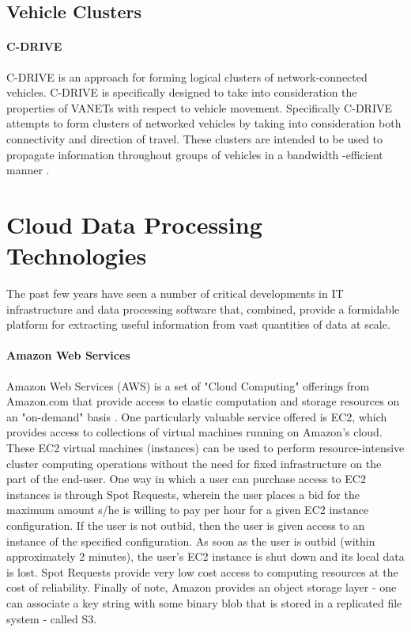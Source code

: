 \documentclass{thesis}
\begin{document}
    \subsection{Vehicle Clusters}
        \paragraph{C-DRIVE}
            C-DRIVE is an approach for forming logical clusters of network-connected vehicles.
            C-DRIVE is specifically designed to take into consideration the properties
            of VANETs with respect to vehicle movement. Specifically C-DRIVE attempts
            to form clusters of networked vehicles by taking into consideration both
            connectivity and direction of travel. These clusters are intended to be
            used to propagate information throughout groups of vehicles in a bandwidth
            -efficient manner \cite{cdrive}.
    \section{Cloud Data Processing Technologies}
        The past few years have seen a number of critical developments in IT
        infrastructure and data processing software that, combined, provide
        a formidable platform for extracting useful information from vast
        quantities of data at scale.
        \paragraph{Amazon Web Services}
            Amazon Web Services (AWS) is a set of "Cloud Computing" offerings
            from Amazon.com that provide access to elastic computation and storage
            resources on an "on-demand" basis \cite{aws}. One particularly valuable
            service offered is EC2, which provides access to collections of virtual
            machines running on Amazon's cloud. These EC2 virtual machines (instances)
            can be used to perform resource-intensive cluster computing operations without
            the need for fixed infrastructure on the part of the end-user. One way in which
            a user can purchase access to EC2 instances is through Spot Requests, wherein the
            user places a bid for the maximum amount s/he is willing to pay per hour for a given
            EC2 instance configuration. If the user is not outbid, then the user is given access
            to an instance of the specified configuration. As soon as the user is outbid (within
            approximately 2 minutes), the user's EC2 instance is shut down and its local data is
            lost. Spot Requests provide very low cost access to computing resources at the cost of
            reliability.%
            Finally of note, Amazon provides an object storage layer - one can associate a key string
            with some binary blob that is stored in a replicated file system - called S3.
\end{document}
